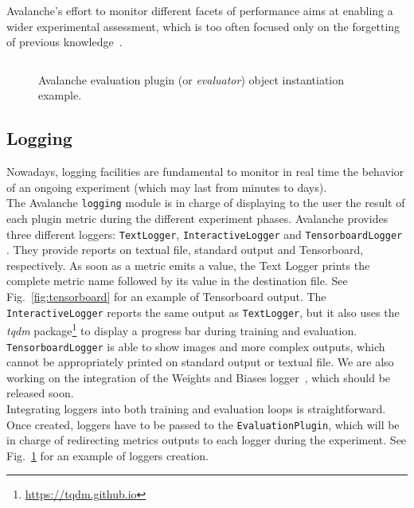 \documentclass[final]{cvpr}
\theoremstyle{definition}
\newcommand{\codeinline}[1]{\texttt{#1}}
\begin{document}
Avalanche's effort to monitor different facets of performance aims at enabling a wider experimental assessment, which is too often focused only on the forgetting of previous knowledge~\cite{diaz-rodriguez2018}.

\begin{figure}[ht]
\begin{tcolorbox}[title={Evaluation Plugin}, colback=mygray]
\inputminted{python}{eval_plugin.py} 
\end{tcolorbox}
\caption{Avalanche evaluation plugin (or \emph{evaluator}) object instantiation example.}
\label{code:eval-plugin}
\end{figure}

\subsection{Logging} \label{sec:logging}
Nowadays, logging facilities are fundamental to monitor in real time the behavior of an ongoing experiment (which may last from minutes to days). \\
The Avalanche \codeinline{logging} module is in charge of displaying to the user the result of each plugin metric during the different experiment phases. Avalanche provides three different loggers: \codeinline{TextLogger}, \codeinline{InteractiveLogger} and \codeinline{TensorboardLogger} \cite{tensorflow2015-whitepaper}. They provide reports on textual file, standard output and Tensorboard, respectively. As soon as a metric emits a value, the Text Logger prints the complete metric name followed by its value in the destination file. See Fig.~\ref{fig:tensorboard} for an example of Tensorboard output. The \texttt{InteractiveLogger} reports the same output as \texttt{TextLogger}, but it also uses the \emph{tqdm} package\footnote{\url{https://tqdm.github.io}} %
to display a progress bar during training and evaluation. \texttt{TensorboardLogger} is able to show images and more complex outputs, which cannot be appropriately printed on standard output or textual file. We are also working on the integration of the Weights and Biases logger~\cite{wandb}, which should be released soon.\\
Integrating loggers into both training and evaluation loops is straightforward. Once created, loggers have to be passed to the \texttt{EvaluationPlugin}, which will be in charge of redirecting metrics outputs to each logger during the experiment. See Fig.~\ref{code:eval-plugin} for an example of loggers creation.
\end{document}
